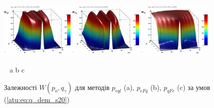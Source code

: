 \begin{figure}[htb!]
  \begin{center}
    \includegraphics[width=0.32\textwidth]{p/qls_pe-p_po_qg_Wql_s20.png}
    \hfill
    \includegraphics[width=0.32\textwidth]{p/qls_pe-p_po_qg_WFq_s20.png}
    \hfill
    \includegraphics[width=0.32\textwidth]{p/qls_pe-p_po_qg_WFc_s20.png}
  \end{center}
  \vspace{-1.0ex}
  \begin{center}
    ~ \hfill a \hfill\hfill b \hfill\hfill c \hfill ~
  \end{center}
  \vspace{-2.0ex}
  \caption{Залежності $W(p_o,q_\gamma)$ для методів $p_{eql}$ (a), $p_{eFq}$ (b), $p_{qFc}$ (c) за умов (\ref{atu:eq:q_dem_s20})}
  \label{atu:f:qsl_W_po_qg_s20}
\end{figure}

